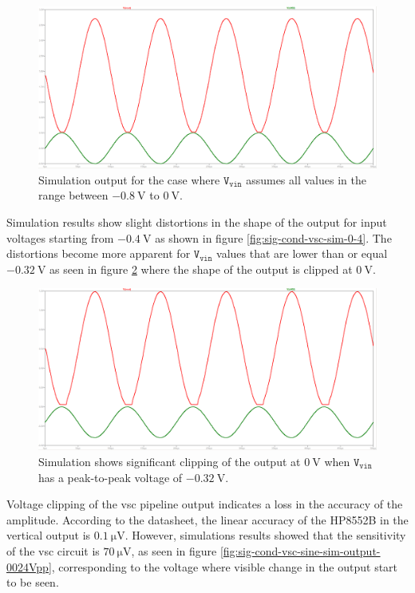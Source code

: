 \documentclass[class=report,11pt,crop=false]{standalone}
\begin{document}
	\begin{figure}[h!]
		\centering
		\includegraphics[width=0.7\linewidth]{Figures/Methodology/sig-cond-vsc-sine-sim-output}
		\caption{Simulation output for the case where $\texttt{V}_\texttt{vin}$ assumes all values in the range between $-\SI{0.8}{\volt}$ to $\SI{0}{\volt}$.}
		\label{fig:sig-cond-vsc-sine-sim-output}
	\end{figure} 

	Simulation results show slight distortions in the shape of the output for input voltages starting from $-\SI{0.4}{\volt}$ as shown in figure \ref{fig:sig-cond-vsc-sim-0-4}. The distortions become more apparent for $\texttt{V}_\texttt{vin}$ values that are lower than or equal $-\SI{0.32}{\volt}$ as seen in figure \ref{fig:sig-cond-vsc-sine-sim-0-16Vpp} where the shape of the output is clipped at $\SI{0}{\volt}$. 
	
	\begin{figure}[h!]
		\centering
		\includegraphics[width=0.7\linewidth]{Figures/Methodology/sig-cond-vsc-sine-sim-output-0-32Vpp}
		\caption{Simulation shows significant clipping of the output at $\SI{0}{\volt}$ when $\texttt{V}_\texttt{vin}$ has a peak-to-peak voltage of $-\SI{0.32}{\volt}$.}
		\label{fig:sig-cond-vsc-sine-sim-0-16Vpp}
	\end{figure}  

	Voltage clipping of the \acrshort{vsc} pipeline output indicates a loss in the accuracy of the amplitude. According to the datasheet, the linear accuracy of the HP8552B in the vertical output is $\SI{0.1}{\micro\volt}$. However, simulations results showed that the sensitivity of the \acrshort{vsc} circuit is $\SI{70}{\micro\volt}$, as seen in figure \ref{fig:sig-cond-vsc-sine-sim-output-0024Vpp}, corresponding to the voltage where visible change in the output start to be seen. 
	
\end{document}

